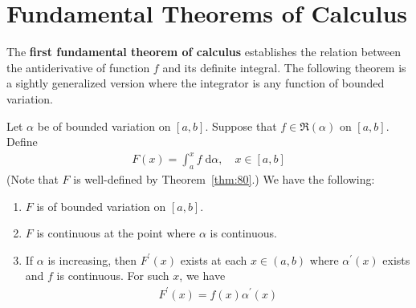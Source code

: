 \documentclass[thmcnt=section, 12pt]{my-elegantbook}
\begin{document}

\section{Fundamental Theorems of Calculus}


The \textbf{first fundamental theorem of calculus}
establishes the relation between the antiderivative of function $f$
and its definite integral.
The following theorem is a sightly generalized version
where the integrator is any function of bounded variation.

\begin{theorem} \label{thm:79}
    Let $\alpha$ be of bounded variation on $[a, b]$.
    Suppose that $f \in \mathfrak{R}(\alpha)$ on $[a, b]$.
    Define
    \begin{align*}
        F(x) = \int_a^x f \; \mathrm{d} \alpha,
        \quad x \in [a, b]
    \end{align*}
    (Note that $F$ is well-defined by Theorem~\ref{thm:80}.)
    We have the following:
    \begin{enumerate}
        \item $F$ is of bounded variation on $[a, b]$.
        \item $F$ is continuous at the point where $\alpha$ is continuous.
        \item If $\alpha$ is increasing,
              then $F^\prime(x)$ exists at each $x \in (a, b)$
              where $\alpha^\prime(x)$ exists
              and $f$ is continuous. For such $x$, we have
              \begin{align*}
                  F^\prime(x) = f(x) \alpha^\prime(x)
              \end{align*}
    \end{enumerate}
\end{theorem}
\end{document}
